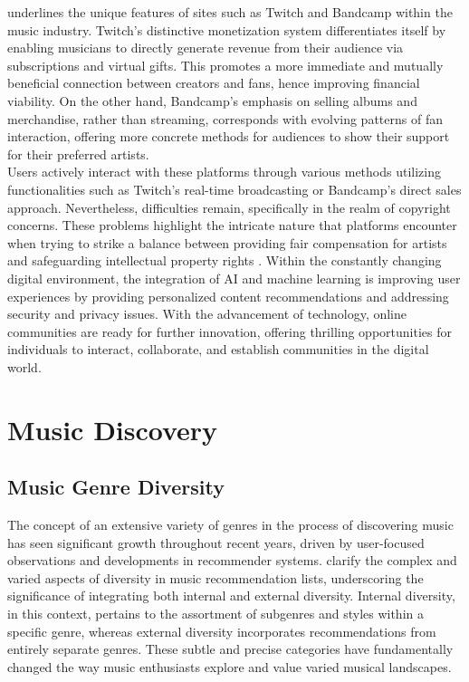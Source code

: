 \textcite{leger21} underlines the unique features of sites such as Twitch and Bandcamp within the music industry. Twitch's distinctive monetization system differentiates itself by enabling musicians to directly generate revenue from their audience via subscriptions and virtual gifts. This promotes a more immediate and mutually beneficial connection between creators and fans, hence improving financial viability. On the other hand, Bandcamp's emphasis on selling albums and merchandise, rather than streaming, corresponds with evolving patterns of fan interaction, offering more concrete methods for audiences to show their support for their preferred artists. \\

Users actively interact with these platforms through various methods utilizing functionalities such as Twitch's real-time broadcasting or Bandcamp's direct sales approach. Nevertheless, difficulties remain, specifically in the realm of copyright concerns. These problems highlight the intricate nature that platforms encounter when trying to strike a balance between providing fair compensation for artists and safeguarding intellectual property rights \parencite{leger21}. Within the constantly changing digital environment, the integration of AI and machine learning is improving user experiences by providing personalized content recommendations and addressing security and privacy issues. With the advancement of technology, online communities are ready for further innovation, offering thrilling opportunities for individuals to interact, collaborate, and establish communities in the digital world.

\section{Music Discovery}
\subsection{Music Genre Diversity}
The concept of an extensive variety of genres in the process of discovering music has seen significant growth throughout recent years, driven by user-focused observations and developments in recommender systems. \textcite{robinson20} clarify the complex and varied aspects of diversity in music recommendation lists, underscoring the significance of integrating both internal and external diversity. Internal diversity, in this context, pertains to the assortment of subgenres and styles within a specific genre, whereas external diversity incorporates recommendations from entirely separate genres. These subtle and precise categories have fundamentally changed the way music enthusiasts explore and value varied musical landscapes. \\

